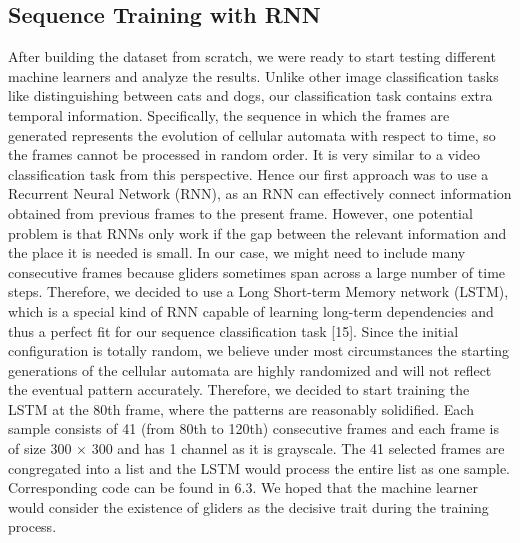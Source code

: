 \documentclass[12pt]{article}
\numberwithin{figure}{section} %
\begin{document}
\subsection{Sequence Training with RNN}
After building the dataset from scratch, we were ready to start testing different machine learners and analyze the results. Unlike other image classification tasks like distinguishing between cats and dogs, our classification task contains extra temporal information. Specifically, the sequence in which the frames are generated represents the evolution of cellular automata with respect to time, so the frames cannot be processed in random order. It is very similar to a video classification task from this perspective. Hence our first approach was to use a Recurrent Neural Network (RNN), as an RNN can effectively connect information obtained from previous frames to the present frame. However, one potential problem is that RNNs only work if the gap between the relevant information and the place it is needed is small. In our case, we might need to include many consecutive frames because gliders sometimes span across a large number of time steps. Therefore, we decided to use a Long Short-term Memory network (LSTM), which is a special kind of RNN capable of learning long-term dependencies and thus a perfect fit for our sequence classification task [15]. Since the initial configuration is totally random, we believe under most circumstances the starting generations of the cellular automata are highly randomized and will not reflect the eventual pattern accurately. Therefore, we decided to start training the LSTM at the 80th frame, where the patterns are reasonably solidified. Each sample consists of 41 (from 80th to 120th) consecutive frames and each frame is of size 300 × 300 and has 1 channel as it is grayscale. The 41 selected frames are congregated into a list and the LSTM would process the entire list as one sample. Corresponding code can be found in 6.3. We hoped that the machine learner would consider the existence of gliders as the decisive trait during the training process. 
\end{document}

